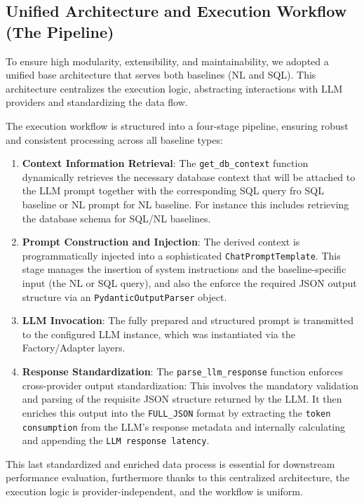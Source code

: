\subsection{Unified Architecture and Execution Workflow (The Pipeline)}
\label{sec:core_arch}
To ensure high modularity, extensibility, and maintainability, we adopted a unified base architecture that serves both baselines (NL and SQL). This architecture centralizes the execution logic, abstracting interactions with LLM providers and standardizing the data flow.

The execution workflow is structured into a four-stage pipeline, ensuring robust and consistent processing across all baseline types:

\begin{enumerate}[leftmargin=*,label=\arabic*.]
    \item \textbf{Context Information Retrieval}: The \texttt{get\_db\_context} function dynamically retrieves the necessary database context that will be attached to the LLM prompt together with the corresponding SQL query fro SQL baseline or NL prompt for NL baseline. For instance this includes retrieving the database schema for SQL/NL baselines.
    \item \textbf{Prompt Construction and Injection}: The derived context is programmatically injected into a sophisticated \texttt{ChatPromptTemplate}. This stage manages the insertion of system instructions and the baseline-specific input (the NL or SQL query), and also the enforce the required JSON output structure via an \texttt{PydanticOutputParser} object.
    \item \textbf{LLM Invocation}: The fully prepared and structured prompt is transmitted to the configured LLM instance, which was instantiated via the Factory/Adapter layers.
    \item \textbf{Response Standardization}: The \texttt{parse\_llm\_response} function enforces cross-provider output standardization: This involves the mandatory validation and parsing of the requisite JSON structure returned by the LLM. It then enriches this output into the \texttt{FULL\_JSON} format by extracting the \texttt{token consumption} from the LLM's response metadata and internally calculating and appending the \texttt{LLM response latency}.
\end{enumerate}
This last standardized and enriched data process is essential for downstream performance evaluation, furthermore thanks to this centralized architecture, the execution logic is provider-independent, and the workflow is uniform.
